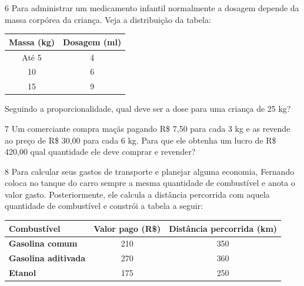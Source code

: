 \pagebreak
\num{6} Para administrar um medicamento infantil normalmente a dosagem
depende da massa corpórea da criança. Veja a distribuição da tabela:

\begin{center}
\begin{tabular}{|c|c|}
\hline
\textbf{Massa (kg)} & \textbf{Dosagem (ml)} \\ \hline
Até 5 & 4 \\ \hline
10 & 6 \\ \hline
15 & 9 \\ \hline
\end{tabular}
\end{center}

Seguindo a proporcionalidade, qual deve ser a dose para uma criança de 25
kg?

\begin{emptybox}
\end{emptybox}

\num{7} Um comerciante compra maçãs pagando R\$ 7,50 para cada 3 kg e as
revende ao preço de R\$ 30,00 para cada 6 kg. Para que ele obtenha um
lucro de R\$ 420,00 qual quantidade ele deve comprar e revender?

\begin{emptybox}
\end{emptybox}

\num{8} Para calcular seus gastos de transporte e planejar alguma economia,
Fernando coloca no tanque do carro sempre a mesma quantidade de combustível 
e anota o valor gasto. Posteriormente, ele calcula a distância percorrida com
aquela quantidade de combustível e constrói a tabela a seguir:

\begin{tabular}{|l |c|c|}
\hline
\textbf{Combustível} & \textbf{Valor pago (R\$)} & \textbf{Distância percorrida (km)} \\ \hline
\textbf{Gasolina comum} & 210 & 350 \\ \hline
\textbf{Gasolina aditivada} & 270 & 360 \\ \hline
\textbf{Etanol} & 175 & 250 \\ \hline
\end{tabular}

